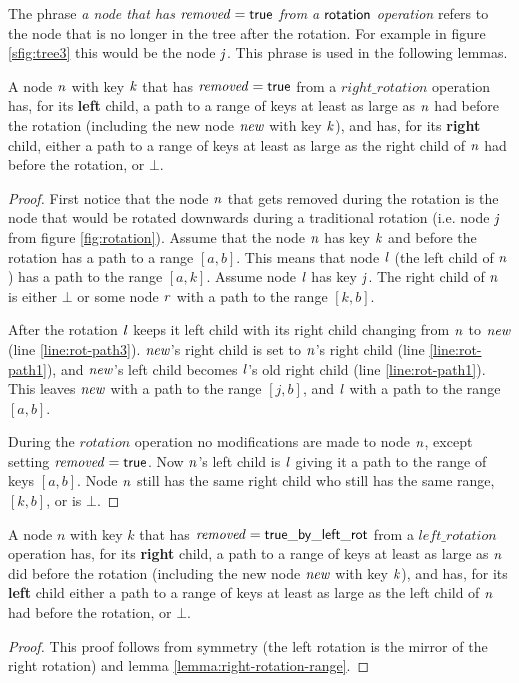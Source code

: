 The phrase \emph{a node that has $\ms{removed}=\lit{true}$ from a $\act{rotation}$ operation} refers to the node that is no longer in the tree after the rotation.
For example in figure \ref{sfig:tree3} this would be the node $\ms{j}$.
This phrase is used in the following lemmas.

\begin{lemma}
\label{lemma:right-rotation-range}
A node $\ms{n}$ with key $\ms{k}$ that has $\ms{removed}=\lit{true}$ from a $right\_rotation$ operation has, for its \textbf{left} child,
a path to a range of keys at least as large as 
$\ms{n}$ had before the rotation (including the new node $\ms{new}$ with key $\ms{k}$), and has, for its \textbf{right} child,
either a path to a range of keys at least as large as the right child of $\ms{n}$ had before the rotation, or $\bot$.
\end{lemma}
\begin{proof}
First notice that the node $\ms{n}$ that gets removed during the rotation is the node that would
be rotated downwards during a traditional rotation (i.e. node $\ms{j}$ from figure \ref{fig:rotation}).
Assume that the node $\ms{n}$ has key $\ms{k}$ and before the rotation has a path to a range $[a, b]$.
This means that node $\ms{l}$ (the left child of $\ms{n}$) has a path to the range $[a, k]$.
Assume node $\ms{l}$ has key $\ms{j}$.
The right child of $\ms{n}$ is either $\bot$ or some node $\ms{r}$ with a path to the range $[k, b]$.

After the rotation $\ms{l}$ keeps it left child with its right child changing from $\ms{n}$ to $\ms{new}$ (line \ref{line:rot-path3}).
$\ms{new}$'s right child is set to $\ms{n}$'s right child (line \ref{line:rot-path1}), and $\ms{new}$'s left child becomes $\ms{l}$'s old right child (line \ref{line:rot-path1}).
This leaves $\ms{new}$ with a path to the range $[j, b]$, and $\ms{l}$ with a path to the range $[a, b]$.

During the $rotation$ operation no modifications are made to node $\ms{n}$, except setting $\ms{removed}=\lit{true}$.
Now $\ms{n}$'s left child is $\ms{l}$ giving it a path to the range of keys $[a, b]$.
Node $\ms{n}$ still has the same right child who still has the same range, $[k, b]$, or is $\bot$.
\end{proof}



\begin{lemma}
\label{lemma:left-rotation-range}
A node $n$ with key $k$ that has $\ms{removed}=\lit{true\_by\_left\_rot}$ from a $left\_rotation$ operation has,
for its \textbf{right} child, a path to a range of keys at least as large as
$\ms{n}$ did before the rotation (including the new node $\ms{new}$ with key $\ms{k}$), and has, for its \textbf{left} child
either a path to a range of keys at least as large as the left child of $\ms{n}$ had before the rotation, or $\bot$.
\end{lemma}
\begin{proof}
This proof follows from symmetry (the left rotation is the mirror of the right rotation) and lemma \ref{lemma:right-rotation-range}.
\end{proof}


